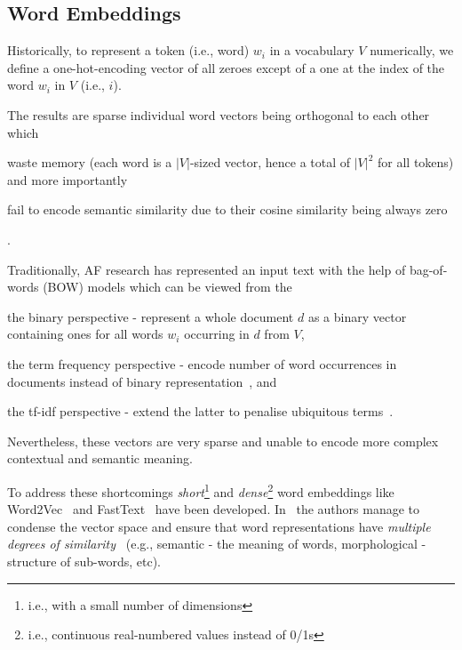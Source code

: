 \subsection{Word Embeddings}\label{subsec:word-embeddings}
Historically, to represent a token (i.e., word) $w_{i}$ in a vocabulary $V$ numerically, we define a one-hot-encoding vector of all zeroes except of a one at the index of the word $w_{i}$ in $V$ (i.e., $i$).

The results are sparse individual word vectors being orthogonal to each other which \begin{enumerate*}
    \item waste memory (each word is a $|V|$-sized vector, hence a total of $|V|^{2}$ for all tokens) and more importantly
    \item fail to encode semantic similarity due to their cosine similarity being always zero
\end{enumerate*}.


Traditionally, AF research has represented an input text with the help of bag-of-words (BOW) models which can be viewed from the  \begin{enumerate*}
    \item the binary perspective - represent a whole document $d$ as a binary vector containing ones for all words $w_{i}$ occurring in $d$ from $V$,
    \item the term frequency perspective - encode number of word occurrences in documents instead of binary representation~\cite{Xu2013AnAT}, and
    \item the tf-idf perspective - extend the latter to penalise ubiquitous terms~\cite{SprckJones1972ASI}.
\end{enumerate*}
Nevertheless, these vectors are very sparse and unable to encode more complex contextual and semantic meaning.

To address these shortcomings \emph{short}\footnote{i.e., with a small number of dimensions} and \emph{dense}\footnote{i.e., continuous real-numbered values instead of 0/1s} word embeddings like Word2Vec~\cite{mikolov2013efficient} and FastText~\cite{bojanowski-etal-2017-enriching} have been developed.
In~\cite{mikolov2013efficient} the authors manage to condense the vector space and ensure that word representations have \emph{multiple degrees of similarity}~\cite{mikolov-etal-2013-linguistic} (e.g., semantic - the meaning of words, morphological - structure of sub-words, etc).


